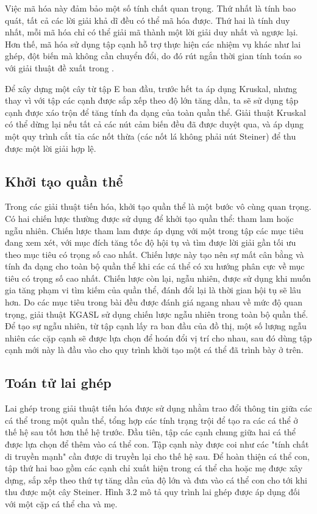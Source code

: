 \documentclass{hust}
\begin{document}
Việc mã hóa này đảm bảo một số tính chất quan trọng. Thứ nhất là tính bao quát, tất cả các lời giải khả dĩ đều có thể mã hóa được. Thứ hai là tính duy nhất, mỗi mã hóa chỉ có thể giải mã thành một lời giải duy nhất và ngược lại. Hơn thế, mã hóa sử dụng tập cạnh hỗ trợ thực hiện các nhiệm vụ khác như lai ghép, đột biến mà không cần chuyển đổi, do đó rút ngắn thời gian tính toán so với giải thuật đề xuất trong \cite{lu2014construction}.


Để xây dựng một cây từ tập E ban đầu, trước hết ta áp dụng Kruskal, nhưng thay vì với tập các cạnh được sắp xếp theo độ lớn tăng dần, ta sẽ sử dụng tập cạnh được xáo trộn để tăng tính đa dạng của toàn quần thể. Giải thuật Kruskal có thể dừng lại nếu tất cả các nút cảm biến đều đã được duyệt qua, và áp dụng một quy trình cắt tỉa các nốt thừa (các nốt lá không phải nút Steiner) để thu được một lời giải hợp lệ.


\subsection{Khởi tạo quần thể} \label{initialization}

Trong các giải thuật tiến hóa, khởi tạo quần thể là một bước vô cùng quan trọng. Có hai chiến lược thường được sử dụng để khởi tạo quần thể: tham lam hoặc ngẫu nhiên. Chiến lược tham lam được áp dụng với một trong tập các mục tiêu đang xem xét, với mục đích tăng tốc độ hội tụ và tìm được lời giải gần tối ưu theo mục tiêu có trọng số cao nhất. Chiến lược này tạo nên sự mất cân bằng và tính đa dạng cho toàn bộ quần thể khi các cá thể có xu hướng phân cực về mục tiêu có trọng số cao nhất. Chiến lược còn lại, ngẫu nhiên, được sử dụng khi muốn gia tăng phạm vi tìm kiếm của quần thể, đánh đổi lại là thời gian hội tụ sẽ lâu hơn.
Do các mục tiêu trong bài đều được đánh giá ngang nhau về mức độ quan trọng, giải thuật KGASL sử dụng chiến lược ngẫu nhiên trong toàn bộ quần thể. Để tạo sự ngẫu nhiên, từ tập cạnh lấy ra ban đầu của đồ thị, một số lượng ngẫu nhiên các cặp cạnh sẽ được lựa chọn để hoán đổi vị trí cho nhau, sau đó dùng tập cạnh mới này là đầu vào cho quy trình khởi tạo một cá thể đã trình bày ở trên.


\subsection{Toán tử lai ghép} \label{crossover}

Lai ghép trong giải thuật tiến hóa được sử dụng nhằm trao đổi thông tin giữa các cá thể trong một quần thể, tổng hợp các tính trạng trội để tạo ra các cá thể ở thế hệ sau tốt hơn thế hệ trước. Đầu tiên, tập các cạnh chung giữa hai cá thể được lựa chọn để thêm vào cá thể con. Tập cạnh này được coi như các "tính chất di truyền mạnh" cần được di truyền lại cho thế hệ sau. Để hoàn thiện cá thể con, tập thứ hai bao gồm các cạnh chỉ xuất hiện trong cá thể cha hoặc mẹ được xây dựng, sắp xếp theo thứ tự tăng dần của độ lớn và đưa vào cá thể con cho tới khi thu được một cây Steiner. Hình 3.2 mô tả quy trình lai ghép được áp dụng đối với một cặp cá thể cha và mẹ.
\end{document}
